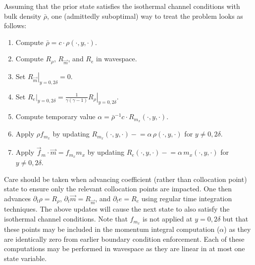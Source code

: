 \documentclass[letterpaper,11pt,nointlimits,reqno]{amsart}
\begin{document}
Assuming that the prior state satisfies the isothermal channel conditions with
bulk density $\bar{\rho}$, one (admittedly suboptimal) way to treat the
problem looks as follows:
\begin{enumerate}
  \item Compute $\bar{\rho} = c \cdot \rho\!\left(\cdot,y,\cdot\right)$.
  \item Compute $R_{\rho}$, $R_{\vec{m}}$, and $R_{e}$ in wavespace.
  \item Set $\left.R_{\vec{m}}\right|_{y=0,2\delta} = 0$.
  \item Set $\left.R_{e}\right|_{y=0,2\delta} =
        \frac{1}{\gamma\left(\gamma-1\right)}
        \left.R_{\rho}\right|_{y=0,2\delta}$.
  \item Compute temporary value $\alpha =
        \bar{\rho}^{-1} c \cdot R_{m_{x}}\!\left(\cdot,y,\cdot\right)$.
  \item Apply $\rho f_{m_x}$ by updating
        $R_{m_x}\!\left(\cdot,y,\cdot\right) -{}\!\!\!{}=
        \alpha \, \rho\!\left(\cdot,y,\cdot\right)$ for $y\neq0,2\delta$.
  \item Apply $\vec{f}_{m}\cdot\vec{m} = f_{m_x} m_x$ by updating
        $R_{e}\!\left(\cdot,y,\cdot\right) -{}\!\!\!{}=
        \alpha \, m_{x}\!\left(\cdot,y,\cdot\right)$
        for $y\neq0,2\delta$.
\end{enumerate}
Care should be taken when advancing coefficient (rather than collocation point)
state to ensure only the relevant collocation points are impacted.  One then
advances $\partial_{t}\rho = R_{\rho}$, $\partial_{t} \vec{m} = R_{\vec{m}}$,
and $\partial_{t} e = R_{e}$ using regular time integration techniques.  The
above updates will cause the next state to also satisfy the isothermal channel
conditions.  Note that $f_{m_x}$ is not applied at $y=0,2\delta$ but that these
points may be included in the momentum integral computation ($\alpha$) as they
are identically zero from earlier boundary condition enforcement.  Each of
these computations may be performed in wavespace as they are linear in at most
one state variable.




\end{document}
